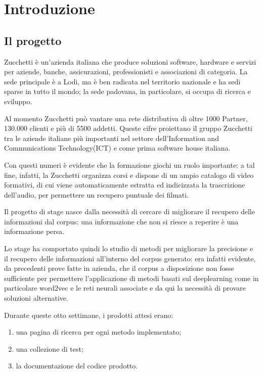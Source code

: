 
\chapter{Introduzione}
\label{cap:introduzione}
\section{Il progetto}
Zucchetti è un’azienda italiana che produce soluzioni software, hardware e servizi
per aziende, banche, assicurazioni, professionisti e associazioni di categoria. 
La sede principale è a Lodi, ma è ben radicata nel territorio nazionale e ha sedi sparse in tutto il mondo;
la sede padovana, in particolare, si occupa di ricerca e sviluppo.

Al momento Zucchetti può vantare una rete distributiva di oltre 1000 Partner, 130.000
clienti e più di 5500 addetti. Queste cifre proiettano il gruppo Zucchetti tra le aziende italiane 
più importanti nel settore dell’Information and Communications Technology(ICT) e come prima
software house italiana.

Con questi numeri è evidente che la formazione giochi un ruolo importante: a tal fine, infatti, la 
Zucchetti organizza corsi e dispone di un ampio catalogo di video formativi, di cui viene automaticamente 
estratta ed indicizzata la trascrizione dell’audio, per permettere un recupero puntuale dei filmati.

Il progetto di stage nasce dalla necessità di cercare di migliorare il recupero delle informazioni 
dal \gls{corpus}: una informazione che non si riesce a reperire è una informazione persa.

Lo stage ha comportato quindi lo studio di metodi per migliorare la precisione e il recupero delle informazioni
all’interno del corpus generato: era infatti evidente, da precedenti prove fatte in azienda, che il corpus
a disposizione non fosse sufficiente per permettere l’applicazione di 
metodi basati sul deeplearning come in particolare word2vec e le reti neurali associate e da qui la necessità di provare soluzioni alternative.

Durante queste otto settimane, i prodotti attesi erano:
\begin{enumerate}
    \item una pagina di ricerca per ogni metodo implementato; 
    \item una collezione di test;
    \item la documentazione del codice prodotto.
\end{enumerate}

